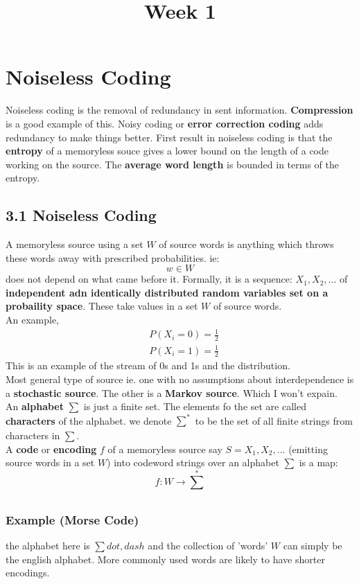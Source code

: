 \documentclass{article}
\begin{document}
\title{Week 1}
\section{Noiseless Coding}

Noiseless coding is the removal of redundancy in sent information. \textbf{Compression} is a good example of this.
Noisy coding or \textbf{error correction coding} adds redundancy to make things better. First result in noiseless coding is that the 
\textbf{entropy} of a memoryless souce gives a lower bound on the length of a code working on the source. The \textbf{average word length} is bounded in terms of the entropy.

\subsection*{3.1 Noiseless Coding}
A memoryless source using a set $W$ of source words is anything which throws these words away with prescribed probabilities.
ie:
\[w \in W\]
does not depend on what came before it.
Formally, it is a sequence: $X_1, X_2,...$ of \textbf{independent adn identically distributed random variables set on a probaility space}. These take values in a set $W$ of source words.
\\
An example,
\begin{align*}
    &P(X_i = 0) = \frac{1}{2}\\
    &P(X_i = 1) = \frac{1}{2}
\end{align*}
This is an example of the stream of 0s and 1s and the distribution.
\\
Most general type of source ie. one with no assumptions about interdependence is a \textbf{stochastic source}. The other is a \textbf{Markov source}. Which I won't expain.
\\
An \textbf{alphabet} $\sum$ is just a finite set. The elements fo the set are called \textbf{characters} of the alphabet. 
we denote $\sum_{}^{*}$ to be the set of all finite strings from characters in $\sum$.
\\
A \textbf{code} or \textbf{encoding} $f$ of a memoryless source say $S = X_1, X_2,...$ (emitting source words in a set $W$) into codeword strings over an alphabet $\sum$ is a map:
\[f:W \rightarrow \sum_{}^{*}\]
\subsubsection*{Example (Morse Code)}
the alphabet here is $\sum {dot, dash}$ and the collection of 'words' $W$ can simply be the english alphabet. More commonly used words are likely to have shorter encodings.
\end{document}

